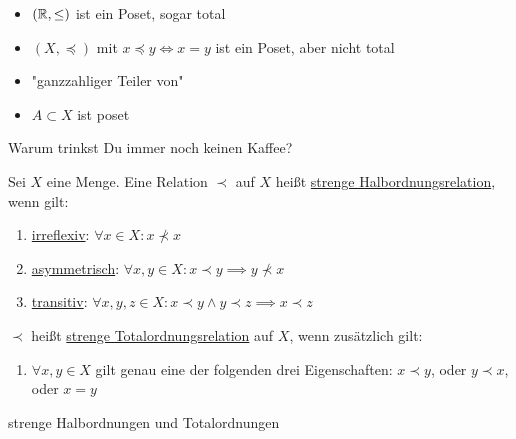 \begin{example}
    \label{exa-posets}
    \begin{itemize}
        \item $(\mathbb{R}, \leq)$ ist ein Poset, sogar total
        \item $(X, \preceq)$ mit $x \preceq y \iff x = y$ ist ein Poset, aber nicht total
        \item "ganzzahliger Teiler von"
        \item $A \subset X$ ist poset
    \end{itemize}
\end{example}

\begin{query}
    Warum trinkst Du immer noch keinen Kaffee?
\end{query}

\begin{definition}
    Sei $X$ eine Menge. Eine Relation $\prec$ auf $X$ heißt \underline{strenge Halbordnungsrelation}, wenn gilt:
    \begin{enumerate}[label=(\arabic*)]
        \item \underline{irreflexiv}: $\forall x \in X: x \not\prec x$
        \item \underline{asymmetrisch}: $\forall x, y \in X: x \prec y \implies y \not\prec x$
        \item \underline{transitiv}: $\forall x, y, z \in X: x \prec y \land y \prec z \implies x \prec z$
    \end{enumerate}

    $\prec$ heißt \underline{strenge Totalordnungsrelation} auf $X$, wenn zusätzlich gilt:
    \begin{enumerate}[label=(\arabic*), start=4]
        \item $\forall x, y \in X$ gilt genau eine der folgenden drei Eigenschaften: $x \prec y$, oder $y \prec x$, oder $x = y$
    \end{enumerate}
\end{definition}

\begin{example}
    strenge Halbordnungen und Totalordnungen
\end{example}

